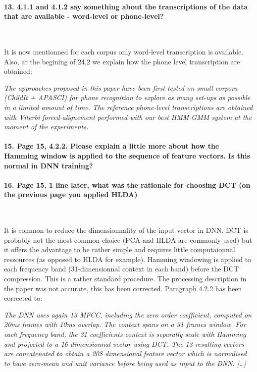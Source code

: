 \documentclass[]{article}
\begin{document}
\paragraph{13. 4.1.1 and 4.1.2 say something about the transcriptions of the data that are available - word-level or phone-level?}

~

It is now mentionned for each corpus only word-level transcription is available. Also, at the begining of 24.2 we explain how the phone level transcription are obtained:

\textit{The approaches proposed in this paper have been first tested on small corpora (ChildIt + APASCI) for phone recognition to explore as many set-ups as possible in a limited amount of time. The reference phone-level transcriptions are obtained with Viterbi forced-alignement performed with our best HMM-GMM system at the moment of the experiments.}

\paragraph{15. Page 15, 4.2.2. Please explain a little more about how the Hamming window is applied to the sequence of feature vectors. Is this normal in DNN training?}

\paragraph{16. Page 15, 1 line later, what was the rationale for choosing DCT (on the previous page you applied HLDA)}

~

It is common to reduce the dimensionnality of the input vector in DNN. DCT is probably not the most common choice (PCA and HLDA are commonly used) but it offers the advantage to be rather simple and requires little computaionnal ressources (as opposed to HLDA for example). Hamming windowing is applied to each frequency band (31-dimensionnal context in each band) before the DCT compression. This is a rather standard procedure. The processing description in the paper was not accurate, this has been corrected. Paragraph 4.2.2 has been corrected to:

\textit{The DNN  uses again  13 MFCC, including  the zero  order coefficient, computed on 20ms  frames with 10ms overlap. The context spans on a 31 frames  window. For each frequency band, the 31 coefficients context is separatly scale with Hamming and projected to a 16 dimensionnal vector using DCT. The 13 resulting vectors are concatenated to obtain a 208 dimensional feature  vector which is normalised to have zero-mean and unit variance before being used as input to the DNN. [\dots]}
\end{document}
